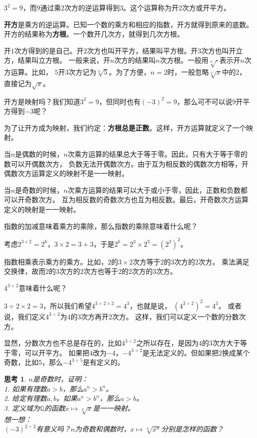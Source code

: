 \documentclass[12pt,UTF8]{ctexbook}
\newtheorem{sk}{思考}[section]
\begin{document}
$3^2 = 9$，而$9$通过乘$2$次方的逆运算得到$3$。这个运算称为开$2$次方或开平方。

\textbf{开方}是乘方的逆运算。已知一个数的乘方和相应的指数，开方就得到原来的底数。
开方的结果称为\textbf{方根}。一个数开几次方，就得到几次方根。

开$1$次方得到的是自己。开$2$次方也叫开平方，结果叫平方根。开$3$次方也叫开立方，结果叫立方根。
一般来说，开$n$次方的结果叫$n$次方根。一般用$\sqrt[n]{\cdot}$表示开$n$次方运算。比如，
$5$开$3$次方记为$\sqrt[3]{5}$。为了方便，$n=2$时，一般忽略$\sqrt[2]{x}$中的$2$，直接记为$\sqrt{x}$。

开方是映射吗？我们知道$3^2 =9$，但同时也有$(-3)^2 =9$，那么可不可以说$9$开平方得到$-3$呢？

为了让开方成为映射，我们约定：\textbf{方根总是正数}。这样，开方运算就定义了一个映射。

当$n$是偶数的时候，$n$次乘方运算的结果总大于等于零。因此，只有大于等于零的数可以开偶数次方，
负数无法开偶数次方。由于互为相反数的偶数次方相等，开偶数次方运算定义的映射不是一一映射。

当$n$是奇数的时候，$n$次乘方运算的结果可以大于或小于零，因此，正数和负数都可以开奇数次方。
互为相反数的奇数次方也互为相反数。最后，开奇数次方运算定义的映射是一一映射。

指数的加减意味着乘方的乘除，那么指数的乘除意味着什么呢？

考虑$2^{3\times 2} = 2^6$，$3\times 2 = 3 + 3$，于是$2^6 = 2^3 \times 2^3 = \left(2^3\right)^2$。

指数相乘表示乘方的乘方。比如，$2$的$3\times 2$次方等于$2$的$3$次方的$2$次方。
乘法满足交换律，故而$2$的$3$次方的$2$次方也等于$2$的$2$次方的$3$次方。

$4^{3\div 2}$意味着什么呢？

$3\div 2 \times 2 = 3$，所以我们希望$4^{3\div 2 \times 2} = 4^3$，也就是说，
$\left(4^{3\div 2}\right)^2 = 4^3$。
或者说，我们定义$4^{3\div 2}$为$4$的$3$次方再开$2$次方。
这样，我们可以定义一个数的分数次方。

显然，分数次方也不总是存在的，比如$4^{3\div 2}$之所以存在，是因为$4$的$3$次方大于等于零，可以开平方。
如果把$4$改为$-4$，$-4^{3\div 2}$是无法定义的。但如果把$2$换成某个奇数，比如$5$，那么$-4^{3\div 5}$是有定义的。

\begin{sk}\label{sk:3-0-0}
    $n$是奇数时，证明：\\
    1. 如果有理数$a > b$，那么$a^n > b^n$。\\
    2. 给定有理数$a, b$。如果$a^n > b^n$，那么$a > b$。\\
    3. 定义域为$\mathbb{Q}$的函数$x \mapsto \sqrt[n]{x}$是一一映射。\\
    想一想：\\
    $(-3)^{2\div 2}$有意义吗？$n$为奇数和偶数时，$x \mapsto \sqrt[n]{x^n}$分别是怎样的函数？
\end{sk}
\end{document}
